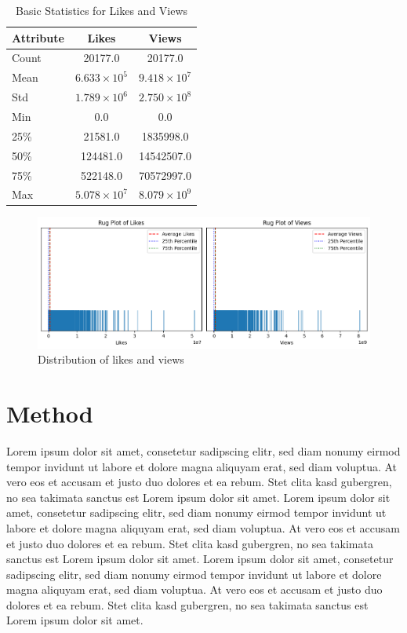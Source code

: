 \documentclass[11pt]{article} %
\begin{document}
\begin{table}[ht]
    \centering
    \begin{tabular}{lcc}
        \toprule
        Attribute & Likes & Views \\
        \midrule
		Count & 20177.0 & 20177.0 \\
		Mean & $6.633\times10^5$ & $9.418\times10^7$ \\
		Std & $1.789\times10^6$ & $2.750\times10^8$ \\
		Min & 0.0 & 0.0 \\
		25\% & 21581.0 & 1835998.0 \\
		50\% & 124481.0 & 14542507.0 \\
		75\% & 522148.0 & 70572997.0 \\
		Max & $5.078\times10^7$ & $8.079\times10^9$ \\
        \bottomrule
    \end{tabular}
    \caption{Basic Statistics for Likes and Views}
    \label{tab:stats}
\end{table}

\begin{figure}
	\centering
	\includegraphics[width=.8\linewidth]{rug_plots_views_likes.png}
	\caption{Distribution of likes and views}\label{fig:rug_plots_views_likes}
\end{figure}


\section{Method}

Lorem ipsum dolor sit amet, consetetur sadipscing elitr, sed diam nonumy eirmod tempor invidunt ut labore et dolore magna aliquyam erat, sed diam voluptua. At vero eos et accusam et justo duo dolores et ea rebum. Stet clita kasd gubergren, no sea takimata sanctus est Lorem ipsum dolor sit amet. Lorem ipsum dolor sit amet, consetetur sadipscing elitr, sed diam nonumy eirmod tempor invidunt ut labore et dolore magna aliquyam erat, sed diam voluptua. At vero eos et accusam et justo duo dolores et ea rebum. Stet clita kasd gubergren, no sea takimata sanctus est Lorem ipsum dolor sit amet. Lorem ipsum dolor sit amet, consetetur sadipscing elitr, sed diam nonumy eirmod tempor invidunt ut labore et dolore magna aliquyam erat, sed diam voluptua. At vero eos et accusam et justo duo dolores et ea rebum. Stet clita kasd gubergren, no sea takimata sanctus est Lorem ipsum dolor sit amet.   
\end{document}
